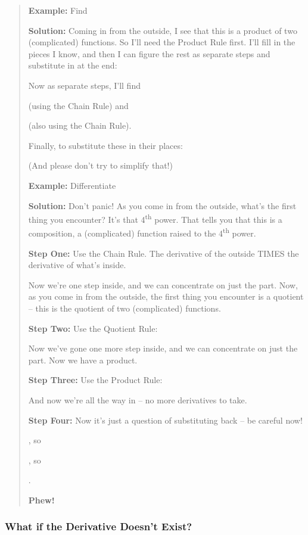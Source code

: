 \begin{quote}
\textbf{Example:} Find

\textbf{Solution:} Coming in from the outside, I see that this is a
product of two (complicated) functions. So I'll need the Product Rule
first. I'll fill in the pieces I know, and then I can figure the rest as
separate steps and substitute in at the end:

Now as separate steps, I'll find

(using the Chain Rule) and

(also using the Chain Rule).

Finally, to substitute these in their places:

(And please don't try to simplify that!)

\textbf{Example:} Differentiate

\textbf{Solution:} Don't panic! As you come in from the outside, what's
the first thing you encounter? It's that 4\textsuperscript{th} power.
That tells you that this is a composition, a (complicated) function
raised to the 4\textsuperscript{th} power.

\textbf{Step One:} Use the Chain Rule. The derivative of the outside
TIMES the derivative of what's inside.

Now we're one step inside, and we can concentrate on just the part. Now,
as you come in from the outside, the first thing you encounter is a
quotient -- this is the quotient of two (complicated) functions.

\textbf{Step Two:} Use the Quotient Rule:

Now we've gone one more step inside, and we can concentrate on just the
part. Now we have a product.

\textbf{Step Three:} Use the Product Rule:

And now we're all the way in -- no more derivatives to take.

\textbf{Step Four:} Now it's just a question of substituting back -- be
careful now!

, so

, so

.

\textbf{Phew!}
\end{quote}

\subsubsection{What if the Derivative Doesn't
Exist?}\label{what-if-the-derivative-doesnt-exist}

